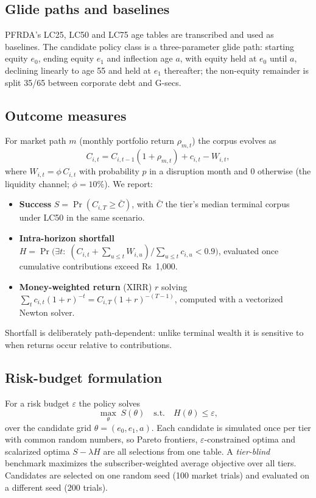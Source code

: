\documentclass[conference]{IEEEtran}
\begin{document}
\subsection{Glide paths and baselines}
PFRDA's LC25, LC50 and LC75 age tables are transcribed and used as baselines. The candidate policy class is a three-parameter glide path: starting equity $e_0$, ending equity $e_1$ and inflection age $a$, with equity held at $e_0$ until $a$, declining linearly to age 55 and held at $e_1$ thereafter; the non-equity remainder is split 35/65 between corporate debt and G-secs.

\subsection{Outcome measures}
For market path $m$ (monthly portfolio return $\rho_{m,t}$) the corpus evolves as
\begin{equation}
C_{i,t}=C_{i,t-1}(1+\rho_{m,t})+c_{i,t}-W_{i,t},
\end{equation}
where $W_{i,t}=\phi\,C_{i,t}$ with probability $p$ in a disruption month and $0$ otherwise (the liquidity channel; $\phi=10\%$). We report:
\begin{itemize}
\item \textbf{Success} $S=\Pr(C_{i,T}\ge \bar C)$, with $\bar C$ the tier's median terminal corpus under LC50 in the same scenario.
\item \textbf{Intra-horizon shortfall} $H=\Pr\big(\exists t:\;(C_{i,t}+\sum_{u\le t}W_{i,u})/\sum_{u\le t}c_{i,u}<0.9\big)$, evaluated once cumulative contributions exceed Rs~1{,}000.
\item \textbf{Money-weighted return} (XIRR) $r$ solving $\sum_t c_{i,t}(1+r)^{-t}=C_{i,T}(1+r)^{-(T-1)}$, computed with a vectorized Newton solver.
\end{itemize}
Shortfall is deliberately path-dependent: unlike terminal wealth it is sensitive to when returns occur relative to contributions.

\subsection{Risk-budget formulation}
For a risk budget $\varepsilon$ the policy solves
\begin{equation}
\max_{\theta}\; S(\theta)\quad\text{s.t.}\quad H(\theta)\le\varepsilon,
\end{equation}
over the candidate grid $\theta=(e_0,e_1,a)$. Each candidate is simulated once per tier with common random numbers, so Pareto frontiers, $\varepsilon$-constrained optima and scalarized optima $S-\lambda H$ are all selections from one table. A \emph{tier-blind} benchmark maximizes the subscriber-weighted average objective over all tiers. Candidates are selected on one random seed (100 market trials) and evaluated on a different seed (200 trials).
\end{document}
